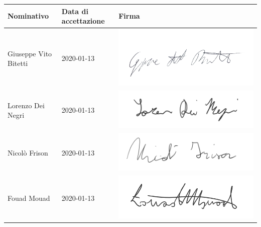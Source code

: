 			\begin{table}[H]
				\centering
				\begin{tabular}{|l|l|l|}
					\hline
					\textbf{Nominativo} & \textbf{Data di accettazione} & \textbf{Firma} \\ \hline
					Giuseppe Vito Bitetti & 2020-01-13 & \includegraphics[scale=0.1]{images/firme/peppe} \\ \hline
					Lorenzo Dei Negri & 2020-01-13 & \includegraphics[scale=0.6]{images/firme/lorenzo} \\ \hline
					Nicolò Frison & 2020-01-13 & \includegraphics[scale=0.6]{images/firme/nicolo} \\ \hline
					Fouad Mouad & 2020-01-13 & \includegraphics[scale=0.6]{images/firme/fouad} \\ \hline

\end{tabular}
\end{table}

